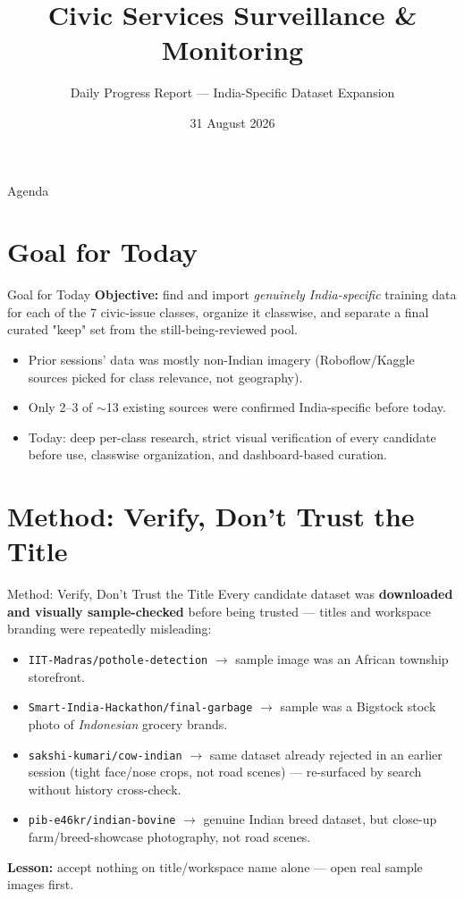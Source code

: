 \documentclass[10pt]{beamer}
\title[Civic Monitor — Daily Update]{Civic Services Surveillance \& Monitoring}
\subtitle{Daily Progress Report — India-Specific Dataset Expansion}
\author{}
\institute{}
\date{31 August 2026}
\begin{document}
\begin{frame}
  \titlepage
\end{frame}

\begin{frame}{Agenda}
  \tableofcontents
\end{frame}

\section{Goal for Today}
\begin{frame}{Goal for Today}
  \textbf{Objective:} find and import \emph{genuinely India-specific} training data for
  each of the 7 civic-issue classes, organize it classwise, and separate a final
  curated "keep" set from the still-being-reviewed pool.
  \vspace{0.5em}
  \begin{itemize}
    \item Prior sessions' data was mostly non-Indian imagery (Roboflow/Kaggle sources
      picked for class relevance, not geography).
    \item Only 2--3 of $\sim$13 existing sources were confirmed India-specific before today.
    \item Today: deep per-class research, strict visual verification of every candidate
      before use, classwise organization, and dashboard-based curation.
  \end{itemize}
\end{frame}

\section{Method: Verify, Don't Trust the Title}
\begin{frame}{Method: Verify, Don't Trust the Title}
  Every candidate dataset was \textbf{downloaded and visually sample-checked} before
  being trusted — titles and workspace branding were repeatedly misleading:
  \begin{itemize}
    \item \texttt{IIT-Madras/pothole-detection} $\to$ sample image was an African township storefront.
    \item \texttt{Smart-India-Hackathon/final-garbage} $\to$ sample was a Bigstock stock photo of
      \emph{Indonesian} grocery brands.
    \item \texttt{sakshi-kumari/cow-indian} $\to$ same dataset already rejected in an earlier
      session (tight face/nose crops, not road scenes) — re-surfaced by search without
      history cross-check.
    \item \texttt{pib-e46kr/indian-bovine} $\to$ genuine Indian breed dataset, but close-up
      farm/breed-showcase photography, not road scenes.
  \end{itemize}
  \textbf{Lesson:} accept nothing on title/workspace name alone — open real sample images first.
\end{frame}
\end{document}
